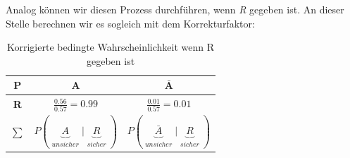 \documentclass[a4paper]{article}
\theoremstyle{definition}
\newtheorem{definition}{Definition}
\theoremstyle{example}
\begin{document}
Analog können wir diesen Prozess durchführen, wenn \textit{R} gegeben ist. An dieser Stelle berechnen wir es sogleich mit dem Korrekturfaktor:\\

\begin{table}[h!]
	\begin{center}
		\caption{Korrigierte bedingte Wahrscheinlichkeit wenn R gegeben ist}
		\label{tab: table1}
		\begin{tabular}{c|c|c}
			\textbf{P} & \textbf{A} & \textbf{$\mathbf{\bar{A}}$}\\
			\hline
			\rule{0pt}{1.2\normalbaselineskip} \textbf{R} & $\frac{0.56}{0.57} = 0.99$ & $\frac{0.01}{0.57} = 0.01$\\[15pt]
			\textbf{$\sum$} & $P(\underbrace{A}_{\substack{unsicher}} | \underbrace{R}_{\substack{sicher}})$ & $P(\underbrace{\bar{A}}_{\substack{unsicher}} | \underbrace{R}_{\substack{sicher}})$
		\end{tabular}
	\end{center}
\end{table}

\end{document}
